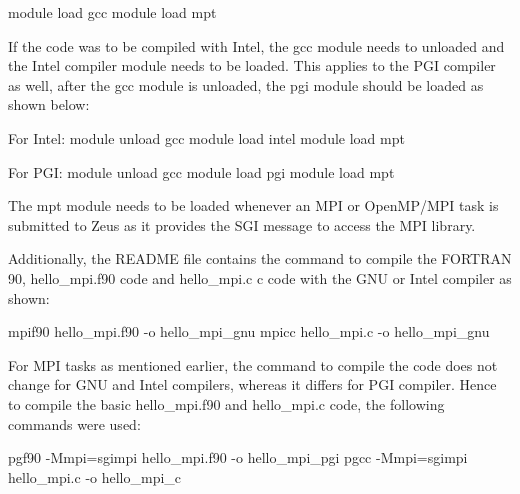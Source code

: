 \begin{Document}
module load gcc
module load mpt

If the code was to be compiled with Intel, the gcc module needs to unloaded and the Intel compiler module needs to be loaded. This applies to the PGI
compiler as well, after the gcc module is unloaded, the pgi module should be loaded as shown below:

For Intel:
module unload gcc
module load intel
module load mpt

For PGI:
module unload gcc
module load pgi
module load mpt

The mpt module needs to be loaded whenever an MPI or OpenMP/MPI task is submitted to Zeus as it provides the SGI message to access the MPI library.

Additionally, the README file contains the command to compile the FORTRAN 90, hello_mpi.f90 code  and hello_mpi.c c code with the GNU or Intel compiler 
as shown:

mpif90 hello_mpi.f90 -o hello_mpi_gnu
mpicc hello_mpi.c -o hello_mpi_gnu

For MPI tasks as mentioned earlier, the command to compile the code does not change for GNU and Intel compilers, whereas it differs for PGI compiler.
Hence to compile the basic hello_mpi.f90 and hello_mpi.c code, the following commands were used:

pgf90 -Mmpi=sgimpi hello_mpi.f90 -o hello_mpi_pgi
pgcc -Mmpi=sgimpi hello_mpi.c -o hello_mpi_c 
  














































\end{Document}
